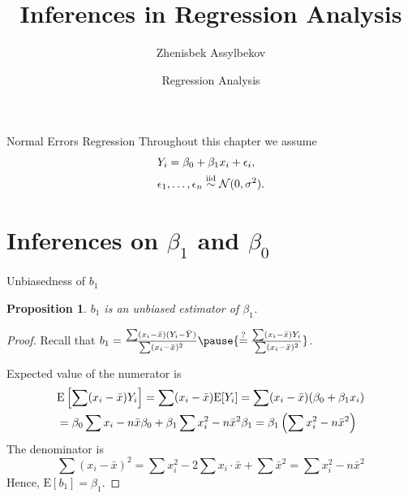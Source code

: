 \documentclass{beamer}
\title{Inferences in Regression Analysis}
\author{Zhenisbek Assylbekov}
\institute{Department of Mathematics}
\date{Regression Analysis}
\newcommand{\E}{\mathrm{E}}
\newtheorem{prop}[theorem]{Proposition}
\begin{document}
\begin{frame}
  \titlepage
\end{frame}

\begin{frame}{Normal Errors Regression}
    Throughout this chapter we assume
    \begin{align*}
    &Y_i=\beta_0+\beta_1 x_i+\epsilon_i,\\
    &\epsilon_1,\ldots,\epsilon_n\stackrel{\rm iid}{\sim}\mathcal{N}(0,\sigma^2).
    \end{align*}
\end{frame}

\section{Inferences on $\beta_1$ and $\beta_0$}

\begin{frame}{Unbiasedness of $b_1$}
\begin{prop}
$b_1$ is an unbiased estimator of $\beta_1$.
\end{prop}
\pause\begin{proof}
Recall that $b_1=\frac{\sum(x_i-\bar{x})(Y_i-\bar{Y})}{\sum(x_i-\bar{x})^2}\pause{\stackrel{\text{?}}{=}\frac{\sum(x_i-\bar{x})Y_i}{\sum(x_i-\bar{x})^2}}$.

\pause Expected value of the numerator is
\begin{align}
&\E\left[\sum(x_i-\bar{x})Y_i\right]=\sum(x_i-\bar{x})\E[Y_i]=\sum(x_i-\bar{x})(\beta_0+\beta_1 x_i)\notag\\
&=\beta_0\sum x_i-n\bar{x}\beta_0+\beta_1\sum x_i^2-n\bar{x}^2\beta_1=\beta_1\left(\sum x_i^2-n\bar{x}^2\right)\label{eq:numerator}\notag
\end{align}
\pause The denominator is
$$
\sum(x_i-\bar{x})^2=\sum x_i^2-2\sum x_i\cdot\bar{x}+\sum\bar{x}^2=\sum x_i^2-n\bar{x}^2
$$
\pause Hence, $\E[b_1]=\beta_1$.
\end{proof}
\end{frame}
\end{document}
